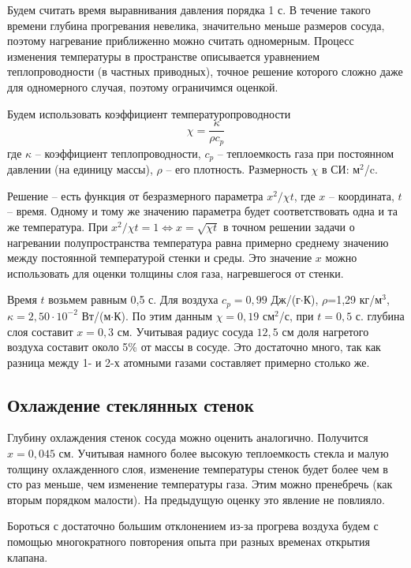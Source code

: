 \documentclass[a4paper,12pt]{report}
\begin{document}
\begin{multicols}{2}
    Будем считать время выравнивания давления порядка 1 с. В течение такого времени глубина прогревания невелика, значительно меньше размеров сосуда, поэтому нагревание приближенно можно считать одномерным. Процесс изменения температуры в пространстве описывается уравнением теплопроводности (в частных приводных), точное решение которого сложно даже для одномерного случая, поэтому ограничимся оценкой.

    Будем использовать коэффициент температуропроводности
    \begin{equation*}
        \chi=\frac{\kappa}{\rho c_p}
    \end{equation*}
    где $\kappa$ -- коэффициент теплопроводности, $c_p$ -- теплоемкость газа при постоянном давлении (на единицу массы), $\rho$ -- его плотность. Размерность $\chi$ в СИ: м$^2$/c.

    Решение -- есть функция от безразмерного параметра $x^2/\chi t$, где $x$ -- координата, $t$ -- время. Одному и тому же значению параметра будет соответствовать одна и та же температура. При $x^2/\chi t=1 \Leftrightarrow x=\sqrt{\chi t}$ в точном решении задачи о нагревании полупространства температура равна примерно среднему значению между постоянной температурой стенки и среды. Это значение $x$ можно использовать для оценки толщины слоя газа, нагревшегося от стенки.
    
    Время $t$ возьмем равным 0,5 с. Для воздуха $c_p=0,99$ Дж/(г$\cdot$К), $\rho$=1,29 кг/м$^3$, $\kappa=2,50\cdot10^{-2}$ Вт/(м$\cdot$К). По этим данным $\chi=0,19$ см$^2$/с, при $t=0,5$ с. глубина слоя составит $x=0,3$ см. Учитывая радиус сосуда $12,5$ см доля нагретого воздуха составит около 5\% от массы в сосуде. Это достаточно много, так как разница между 1- и 2-х атомными газами составляет примерно столько же.

    \subsection*{Охлаждение стеклянных стенок}
    Глубину охлаждения стенок сосуда можно оценить аналогично. Получится $x=0,045$ см. Учитывая намного более высокую теплоемкость стекла и малую толщину охлажденного слоя, изменение температуры стенок будет более чем в сто раз меньше, чем изменение температуры газа. Этим можно пренебречь (как вторым порядком малости). На предыдущую оценку это явление не повлияло.

    Бороться с достаточно большим отклонением из-за прогрева воздуха будем с помощью многократного повторения опыта при разных временах открытия клапана.


\end{multicols}
\end{document}
